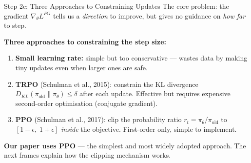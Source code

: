 \documentclass[aspectratio=169,11pt]{beamer}
\begin{document}
\begin{frame}{Step 2c: Three Approaches to Constraining Updates}
  \small
  The core problem: the gradient $\nabla_\theta L^{PG}$ tells us a \emph{direction}
  to improve, but gives no guidance on \emph{how far} to step.

  \medskip
  \textbf{Three approaches to constraining the step size:}

  \begin{enumerate}\setlength\itemsep{6pt}
    \item \textbf{Small learning rate:} simple but too conservative --- wastes
      data by making tiny updates even when larger ones are safe.

    \item \textbf{TRPO} (Schulman et al., 2015): constrain the KL divergence
      $D_{KL}(\pi_\text{old} \| \pi_\theta) \le \delta$ after each update.
      Effective but requires expensive second-order optimisation (conjugate gradient).

    \item \textbf{PPO} (Schulman et al., 2017): \alert{clip the probability ratio}
      $r_t = \pi_\theta / \pi_\text{old}$ to $[1{-}\epsilon,\; 1{+}\epsilon]$
      \emph{inside} the objective.  First-order only, simple to implement.
  \end{enumerate}

  \bigskip
  \textbf{Our paper uses PPO} --- the simplest and most widely adopted approach.
  The next frames explain how the clipping mechanism works.
\end{frame}
\end{document}
